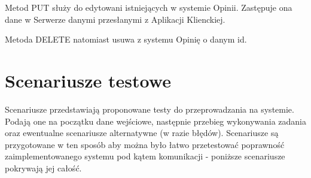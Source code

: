 \documentclass{article}
\begin{document}
Metod PUT służy do edytowani istniejących w systemie Opinii. Zastępuje ona dane w Serwerze danymi przesłanymi z Aplikacji Klienckiej.

Metoda DELETE natomiast usuwa z systemu Opinię o danym id.

\section{Scenariusze testowe}
Scenariusze przedstawiają proponowane testy do przeprowadzania na systemie. Podają one na początku dane wejściowe, następnie przebieg wykonywania zadania oraz ewentualne scenariusze alternatywne (w razie błędów). Scenariusze są przygotowane w ten sposób aby można było łatwo przetestować poprawność zaimplementowanego systemu pod kątem komunikacji - poniższe scenariusze pokrywają jej całość.
\end{document}
